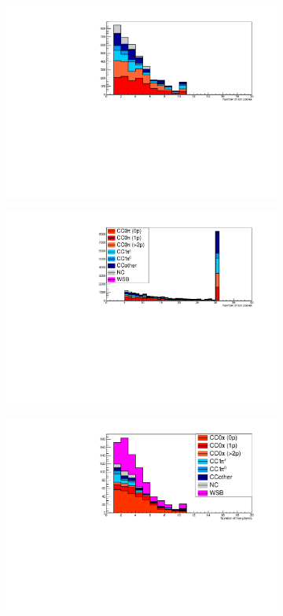 \begin{figure}[tbh]
 \begin{center}
  \begin{subfigure}{0.48\textwidth}
     \includegraphics[width=0.55\linewidth, angle=270]{fig/FHCMuonPenetration_SideMRD_StoppedOrThroughGoing.pdf}
    \end{subfigure}
  \begin{subfigure}{0.48\textwidth}
    \includegraphics[width=0.55\linewidth, angle=270]{fig/FHCMuonPenetration_DownstreamMRD_StoppedOrThroughGoing.pdf}
    \end{subfigure}  
     \begin{subfigure}{0.48\textwidth}
     \includegraphics[width=0.55\linewidth, angle=270]{fig/RHCMuonPenetration_SideMRD_StoppedOrThroughGoing.pdf}

\end{subfigure}
\end{center}
\end{figure}
